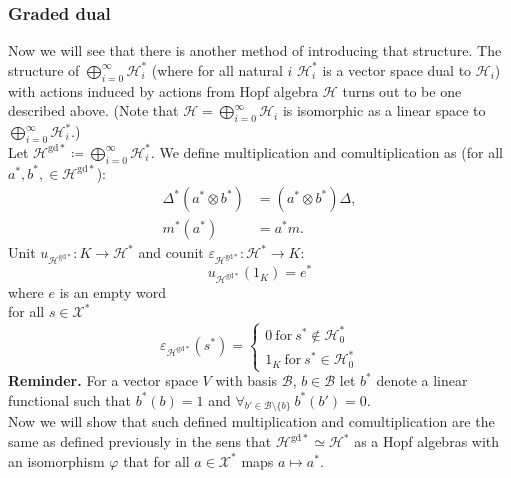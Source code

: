 \documentclass[a4paper, 12pt]{article}
\newcommand{\gdd}[1]{#1^{\mathrm{gd}*}}
\begin{document}
\subsubsection{Graded dual}
Now we will see that there is another method of introducing that structure.
The structure of $\displaystyle\bigoplus^{\infty}_{i = 0} \mathcal{H}_i^*$ (where for all natural $i$
$\mathcal{H}_i^*$ is a vector space dual to $\mathcal{H}_i$) with actions induced by actions
from Hopf algebra $\mathcal{H}$ turns out to be one described above. (Note that $\mathcal{H} =
\displaystyle\bigoplus^{\infty}_{i = 0} \mathcal{H}_i$ is isomorphic as a linear space
to $\displaystyle\bigoplus^{\infty}_{i = 0} \mathcal{H}_i^*$.) \\
\indent Let $\gdd{\mathcal{H}} \coloneqq \displaystyle\bigoplus^{\infty}_{i = 0} \mathcal{H}_i^*$.
We define multiplication
\text{$\Delta^* : \mathcal{H}^{\mathrm{gd}*} \otimes \gdd{\mathcal{H}} \to \gdd{\mathcal{H}}$} and
comultiplication
\text{$m^* : \gdd{\mathcal{H}} \to \gdd{\mathcal{H}} \otimes \gdd{\mathcal{H}}$} as
(for all $a^*, b^*, \in \gdd{\mathcal{H}}$):
\begin{align*}
\Delta^*(a^* \otimes b^*) &= (a^* \otimes b^*)\Delta, \\
m^*(a^*) &= a^*m.
\end{align*}
Unit $u_{\gdd{\mathcal{H}}} : K \to \mathcal{H}^*$ and counit $\varepsilon_{\gdd{\mathcal{H}}}
: \mathcal{H}^* \to K$:
\begin{equation*}
u_{\gdd{\mathcal{H}}}(1_K) = e^*
\end{equation*}
where $e$ is an empty word \\
for all $s \in \mathcal{X}^*$
\begin{equation*}
\varepsilon_{\gdd{\mathcal{H}}}(s^*) = \begin{cases}
0 \mathrm{\ for\ } s^* \notin \mathcal{H}^*_0 \\
1_K \mathrm{\ for\ } s^* \in \mathcal{H}^*_0
\end{cases}
\end{equation*}
\indent\textbf{Reminder. } For a vector space $V$ with basis $\mathcal{B}$,
$b \in \mathcal{B}$ let $b^*$
denote a linear functional such that $b^*(b) = 1$ and
$\forall_{b' \in \mathcal{B}\setminus \{b\}}\ b^*(b') = 0$. \\[8pt]
Now we will show that such defined multiplication and comultiplication are the same as defined previously
in the sens that $\gdd{\mathcal{H}} \simeq \mathcal{H}^*$ as a Hopf algebras with an isomorphism $\varphi$
that for all $a \in \mathcal{X}^*$ maps $a \mapsto a^*$.
\end{document}
